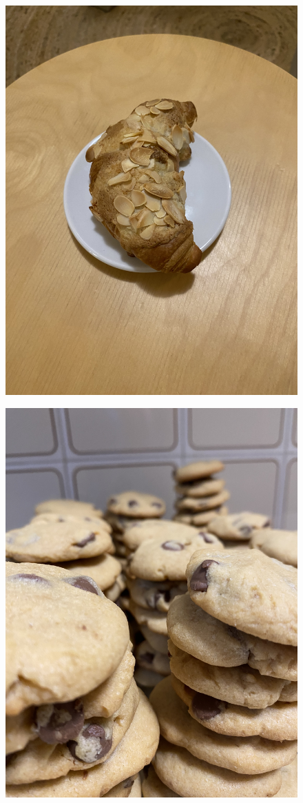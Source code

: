 \documentclass[]{article}
\begin{document}
\newpage\begin{figure}[H]
\begin{center}\hyperref[rec:Almond Frangipane]{\includegraphics[keepaspectratio,width=\textheight,height=\textwidth,angle=-90]{Gallery/Almond Frangipane}}\caption*{}\label{fig:Almond Frangipane}\end{center}
\end{figure}
\newpage\begin{figure}[H]
\begin{center}\hyperref[rec:Choc Chip Biscuits]{\includegraphics[keepaspectratio,width=\textheight,height=\textwidth,angle=-90]{Gallery/Choc Chip Biscuits}}\caption*{}\label{fig:Choc Chip Biscuits}\end{center}
\end{figure}
\end{document}
